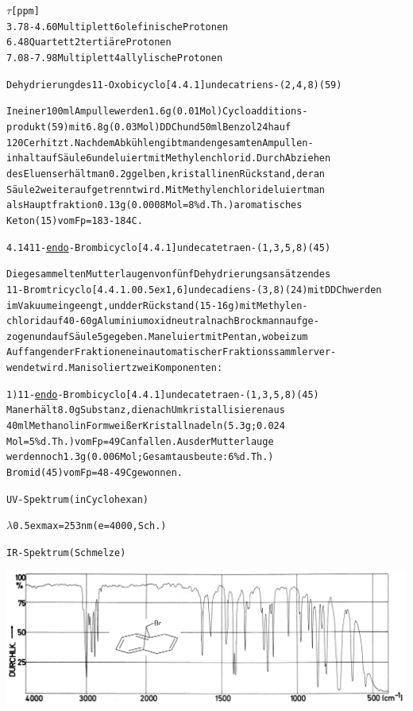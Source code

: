 \documentclass[a4paper,11pt]{article}
\begin{document}
\begin{alltt}

  \(\tau\) [ppm]
3.78 - 4.60     Multiplett     6 olefinische Protonen
6.48            Quartett       2 tertiäre Protonen
7.08 - 7.98     Multiplett     4 allylische Protonen

\newpage
{}


Dehydrierung des 11-Oxobicyclo[4.4.1]undecatriens-(2‚4,8) (59)

In einer 100 ml Ampulle werden 1.6 g (0.01 Mol) Cycloadditions-
produkt (59) mit 6.8 g (0.03 Mol) DDCh und 50 ml Benzol 24 h auf
120\degree{}C erhitzt. Nach dem Abkühlen gibt man den gesamten Ampullen-
inhalt auf Säule 6 und eluiert mit Methylenchlorid. Durch Abziehen
des Eluens erhält man 0.2 g gelben, kristallinen Rückstand, der an
Säule 2 weiter aufgetrennt wird. Mit Methylenchlorid eluiert man
als Hauptfraktion 0.13 g (0.0008 Mol = 8 \% d.Th.) aromatisches
Keton (15) vom Fp = 183 - 184\degree{}C.


4.14 11-\underline{endo}-Brombicyclo[4.4.1]undecatetraen-(1,3,5‚8) (45)

Die gesammelten Mutterlaugen von fünf Dehydrierungsansätzen des
11-Bromtricyclo[4.4.1.0\raise0.5ex\hbox{1,6}]undecadiens-(3,8) (24) mit DDCh werden
im Vakuum eingeengt, und der Rückstand (15 - 16 g) mit Methylen-
chlorid auf 40 - 60 g Aluminiumoxid neutral nach Brockmann aufge-
zogen und auf Säule 5 gegeben. Man eluiert mit Pentan, wobei zum
Auffangen der Fraktionen ein automatischer Fraktionssammler ver-
wendet wird. Man isoliert zwei Komponenten:

1) 11-\underline{endo}-Brombicyclo[4.4.1]undecatetraen-(1,3,5‚8) (45)
   Man erhält 8.0 g Substanz, die nach Umkristallisieren aus
   40 ml Methanol in Form weißer Kristallnadeln (5.3 g; 0.024
   Mol = 5 \% d.Th.) vom Fp = 49\degree{}C anfallen. Aus der Mutterlauge
   werden noch 1.3 g (0.006 Mol; Gesamtausbeute: 6 \% d.Th.)
   Bromid (45) vom Fp = 48 - 49\degree{}C gewonnen.

UV-Spektrum (in Cyclohexan)

\(\lambda\)\lower0.5ex\hbox{max} = 253 nm (e = 4000, Sch.)

\newpage
{}


IR-Spektrum (Schmelze)
\end{alltt}
\hspace*{-0.5cm}\includegraphics[width=15.07cm]{IR_042}
\end{document}

